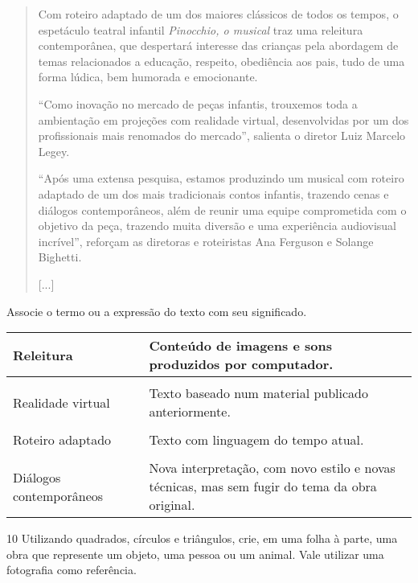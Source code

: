 \begin{quote}
Com roteiro adaptado de um dos maiores clássicos de todos os tempos, o
espetáculo teatral infantil \textit{Pinocchio, o musical} traz uma releitura
contemporânea, que despertará interesse das crianças pela abordagem de
temas relacionados a educação, respeito, obediência aos pais, tudo de
uma forma lúdica, bem humorada e emocionante.

``Como inovação no mercado de peças infantis, trouxemos toda a
ambientação em projeções com realidade virtual, desenvolvidas por um dos
profissionais mais renomados do mercado'', salienta o diretor Luiz
Marcelo Legey.

``Após uma extensa pesquisa, estamos produzindo um musical com roteiro
adaptado de um dos mais tradicionais contos infantis, trazendo cenas e
diálogos contemporâneos, além de reunir uma equipe comprometida com o
objetivo da peça, trazendo muita diversão e uma experiência audiovisual
incrível'', reforçam as diretoras e roteiristas Ana Ferguson e Solange
Bighetti.

{[}...{]}

\end{quote}

Associe o termo ou a expressão do texto com seu significado.

\begin{longtable}[]{@{}lll@{}}
\toprule
Releitura & & Conteúdo de imagens e sons produzidos por
computador.\tabularnewline
\midrule
\endhead
& &\tabularnewline
Realidade virtual & & Texto baseado num material publicado
anteriormente.\tabularnewline
& &\tabularnewline
Roteiro adaptado & & Texto com linguagem do tempo atual.\tabularnewline
& &\tabularnewline
Diálogos contemporâneos & & Nova interpretação, com novo estilo e novas
técnicas, mas sem fugir do tema da obra original.\tabularnewline
\bottomrule
\end{longtable}


\num{10} Utilizando quadrados, círculos e triângulos, crie, em uma folha à parte,
uma obra que represente um objeto, uma pessoa ou um animal. Vale utilizar uma fotografia como referência.

